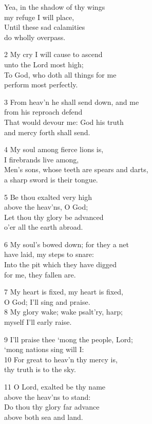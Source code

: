 \begin{multicols}{3}
Yea, in the shadow of thy wings\\
my refuge I will place,\\
Until these sad calamities\\
do wholly overpass.

2 My cry I will cause to ascend\\
unto the Lord most high;\\
To God, who doth all things for me\\
perform most perfectly.

3 From heav’n he shall send down, and me\\
from his reproach defend\\
That would devour me: God his truth\\
and mercy forth shall send.

4 My soul among fierce lions is,\\
I firebrands live among,\\
Men’s sons, whose teeth are spears and darts,\\
a sharp sword is their tongue.

5 Be thou exalted very high\\
above the heav’ns, O God;\\
Let thou thy glory be advanced\\
o’er all the earth abroad.

6 My soul’s bowed down; for they a net\\
have laid, my steps to snare:\\
Into the pit which they have digged\\
for me, they fallen are.

7 My heart is fixed, my heart is fixed,\\
O God; I’ll sing and praise.\\
8 My glory wake; wake psalt’ry, harp;\\
myself I’ll early raise.

9 I’ll praise thee ‘mong the people, Lord;\\
‘mong nations sing will I:\\
10 For great to heav’n thy mercy is,\\
thy truth is to the sky.

11 O Lord, exalted be thy name\\
above the heav’ns to stand:\\
Do thou thy glory far advance\\
above both sea and land.


\end{multicols}
